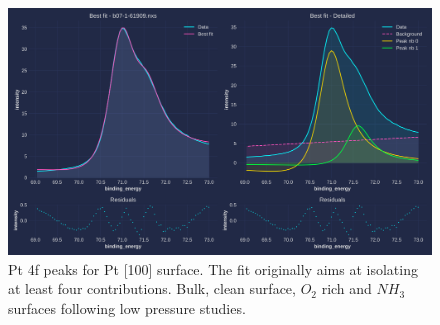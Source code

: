 \begin{frame}

    \begin{figure}
        \centering
        \includegraphics[width=\textwidth]{Figures/xps_data/Pt100pt4f.png}
        \caption{Pt 4f peaks for Pt [100] surface. The fit originally aims at isolating at least four contributions. Bulk, clean surface, $O_2$ rich and $NH_3$ surfaces following low pressure studies.}
        \label{fig:pt4f}
    \end{figure}
    
\end{frame}
